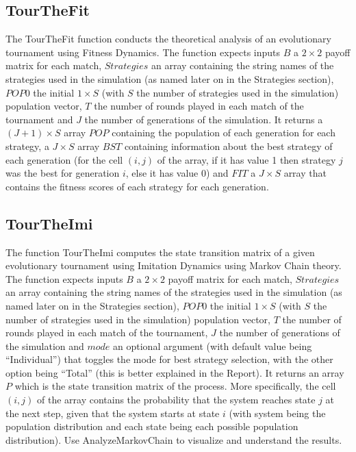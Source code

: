 \documentclass[12pt]{article}
\begin{document}
\subsection{TourTheFit}
The TourTheFit function conducts the theoretical analysis of an evolutionary tournament using Fitness Dynamics. The function expects inputs $B$ a $2 \times 2$ payoff matrix for each match, $Strategies$ an array containing the string names of the strategies used in the simulation (as named later on in the Strategies section), $POP0$ the initial $1 \times S$ (with $S$ the number of strategies used in the simulation) population vector, $T$ the number of rounds played in each match of the tournament and $J$ the number of generations of the simulation. It returns a $(J+1) \times S$ array $POP$ containing the population of each generation for each strategy, a $J \times S$ array $BST$ containing information about the best strategy of each generation (for the cell $(i,j)$ of the array, if it has value 1 then strategy $j$ was the best for generation $i$, else it has value 0) and $FIT$ a $J \times S$ array that contains the fitness scores of each strategy for each generation.

\subsection{TourTheImi}
The function TourTheImi computes the state transition matrix of a given evolutionary tournament using Imitation Dynamics using Markov Chain theory. The function expects inputs $B$ a $2 \times 2$ payoff matrix for each match, $Strategies$ an array containing the string names of the strategies used in the simulation (as named later on in the Strategies section), $POP0$ the initial $1 \times S$ (with $S$ the number of strategies used in the simulation) population vector, $T$ the number of rounds played in each match of the tournament, $J$ the number of generations of the simulation and $mode$ an optional argument (with default value being ``Individual'') that toggles the mode for best strategy selection, with the other option being ``Total'' (this is better explained in the Report). It returns an array $P$ which is the state transition matrix of the process. More specifically, the cell $(i,j)$ of the array contains the probability that the system reaches state $j$ at the next step, given that the system starts at state $i$ (with system being the population distribution and each state being each possible population distribution). Use AnalyzeMarkovChain to visualize and understand the results.
\end{document}
